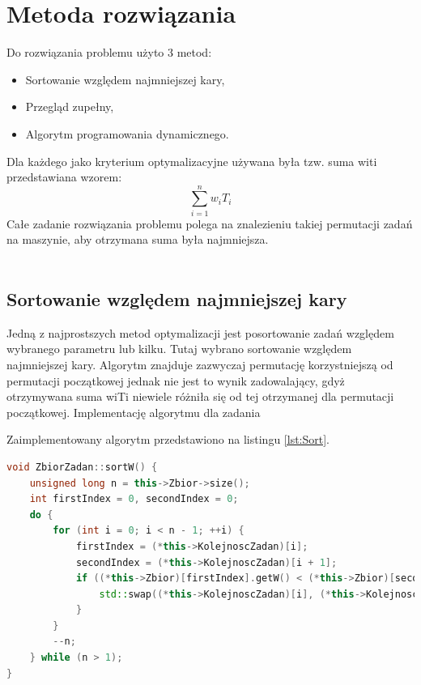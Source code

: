 \documentclass[a4paper]{article}
\begin{document}
\section{Metoda rozwiązania}
Do rozwiązania problemu użyto 3 metod:
\begin{itemize}
	\item Sortowanie względem najmniejszej kary,
	\item Przegląd zupełny,
	\item Algorytm programowania dynamicznego.
\end{itemize}

Dla każdego jako kryterium optymalizacyjne używana była tzw. suma witi przedstawiana wzorem:
\begin{equation}
	\sum_{i=1}^{n}w_{i}T_{i}
\end{equation}
Całe zadanie rozwiązania problemu polega na znalezieniu takiej permutacji zadań na maszynie, aby otrzymana suma była najmniejsza.
\\
\\
\subsection{Sortowanie względem najmniejszej kary}
Jedną z najprostszych metod optymalizacji jest posortowanie zadań względem wybranego parametru lub kilku. Tutaj wybrano sortowanie względem najmniejszej kary. Algorytm znajduje zazwyczaj permutację korzystniejszą od permutacji początkowej jednak nie jest to wynik zadowalający, gdyż otrzymywana suma wiTi niewiele różniła się od tej otrzymanej dla permutacji początkowej.
Implementację algorytmu dla zadania

Zaimplementowany algorytm przedstawiono na listingu \ref{lst:Sort}.
\begin{lstlisting}[firstline = 3,label={lst:Sort},caption={Algorytm Sortowania Bąbelkowego},language=C++]
void ZbiorZadan::sortW() {
    unsigned long n = this->Zbior->size();
    int firstIndex = 0, secondIndex = 0;
    do {
        for (int i = 0; i < n - 1; ++i) {
            firstIndex = (*this->KolejnoscZadan)[i];
            secondIndex = (*this->KolejnoscZadan)[i + 1];
            if ((*this->Zbior)[firstIndex].getW() < (*this->Zbior)[secondIndex].getW()) {
                std::swap((*this->KolejnoscZadan)[i], (*this->KolejnoscZadan)[i + 1]);
            }
        }
        --n;
    } while (n > 1);
}
\end{lstlisting}

\newpage
\end{document}

